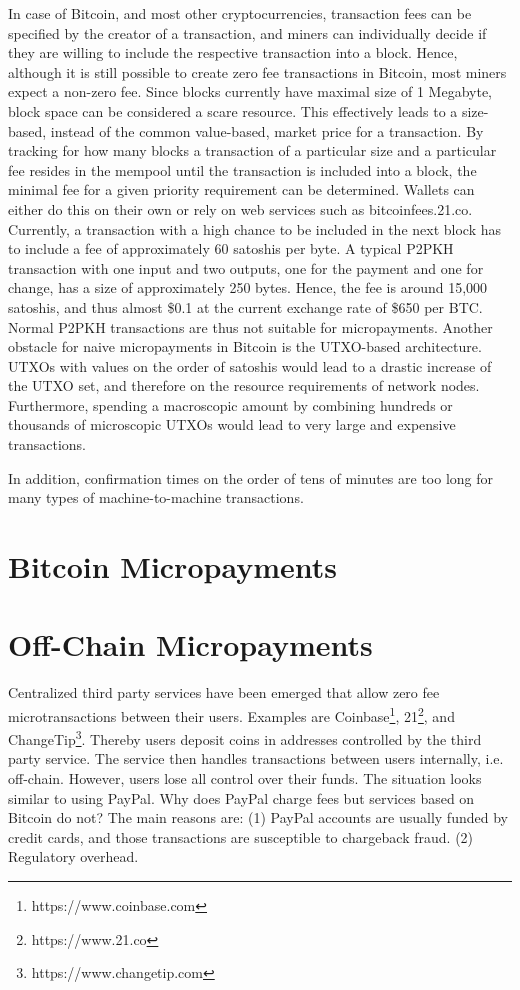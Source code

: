 In case of Bitcoin, and most other cryptocurrencies, transaction fees can be specified by the creator of a transaction, and miners can individually decide if they are willing to include the respective transaction into a block. Hence, although it is still possible to create zero fee transactions in Bitcoin, most miners expect a non-zero fee. Since blocks currently have maximal size of 1 Megabyte, block space can be considered a scare resource. This effectively leads to a size-based, instead of the common value-based, market price for a transaction. By tracking for how many blocks a transaction of a particular size and a particular fee resides in the mempool until the transaction is included into a block, the minimal fee for a given priority requirement can be determined. Wallets can either do this on their own or rely on web services such as bitcoinfees.21.co. 
Currently, a transaction with a high chance to be included in the next block has to include a fee of approximately 60 satoshis per byte. A typical P2PKH transaction with one input and two outputs, one for the payment and one for change, has a size of approximately 250 bytes. Hence, the fee is around 15,000 satoshis, and thus almost \$0.1 at the current exchange rate of \$650 per BTC. 
Normal P2PKH transactions are thus not suitable for micropayments. Another obstacle for naive micropayments in Bitcoin is the UTXO-based architecture. UTXOs with values on the order of satoshis would lead to a drastic increase of the UTXO set, and therefore on the resource requirements of network nodes. Furthermore, spending a macroscopic amount by combining hundreds or thousands of microscopic UTXOs would lead to very large and expensive transactions. 

In addition, confirmation times on the order of tens of minutes are too long for many types of  machine-to-machine transactions.

\section{Bitcoin Micropayments}

\section{Off-Chain Micropayments}

Centralized third party services have been emerged that allow zero fee microtransactions between their users. Examples are Coinbase\footnote{https://www.coinbase.com}, 21\footnote{https://www.21.co}, and ChangeTip\footnote{https://www.changetip.com}. Thereby users deposit coins in addresses controlled by the third party service. The service then handles transactions between users internally, i.e. off-chain. However, users lose all control over their funds. The situation looks similar to using PayPal. Why does PayPal charge fees but services based on Bitcoin do not? The main reasons are: (1) PayPal accounts are usually funded by credit cards, and those transactions are susceptible to chargeback fraud. (2) Regulatory overhead. 


